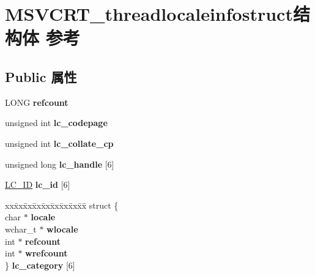 \hypertarget{struct_m_s_v_c_r_t__threadlocaleinfostruct}{}\section{M\+S\+V\+C\+R\+T\+\_\+threadlocaleinfostruct结构体 参考}
\label{struct_m_s_v_c_r_t__threadlocaleinfostruct}
\subsection*{Public 属性}
\begin{DoxyCompactItemize}
\item 
\mbox{\label{struct_m_s_v_c_r_t__threadlocaleinfostruct_a74b1f8873b4e24d3b69bce45a7f7c86f}} 
L\+O\+NG {\bfseries refcount}
\item 
\mbox{\label{struct_m_s_v_c_r_t__threadlocaleinfostruct_a2383c3d9b8f231fb05d404a45e738f1c}} 
unsigned int {\bfseries lc\+\_\+codepage}
\item 
\mbox{\label{struct_m_s_v_c_r_t__threadlocaleinfostruct_ab21373ecc2963895877a2a82e71748a0}} 
unsigned int {\bfseries lc\+\_\+collate\+\_\+cp}
\item 
\mbox{\label{struct_m_s_v_c_r_t__threadlocaleinfostruct_a9207f9df8e572707e7ebf4c29ca87710}} 
unsigned long {\bfseries lc\+\_\+handle} \mbox{[}6\mbox{]}
\item 
\mbox{\label{struct_m_s_v_c_r_t__threadlocaleinfostruct_ad6b63dd6c9f157869e19756cbac51a50}} 
\hyperlink{structtag_l_c___i_d}{L\+C\+\_\+\+ID} {\bfseries lc\+\_\+id} \mbox{[}6\mbox{]}
\item 
\mbox{\label{struct_m_s_v_c_r_t__threadlocaleinfostruct_aec81145e026eeb5fc406b82dec324dd1}} 
\begin{tabbing}
xx\=xx\=xx\=xx\=xx\=xx\=xx\=xx\=xx\=\kill
struct \{\\
\>char $\ast$ {\bfseries locale}\\
\>wchar\_t $\ast$ {\bfseries wlocale}\\
\>int $\ast$ {\bfseries refcount}\\
\>int $\ast$ {\bfseries wrefcount}\\
\} {\bfseries lc\_category} \mbox{[}6\mbox{]}\\


\end{tabbing}
\end{DoxyCompactItemize}

